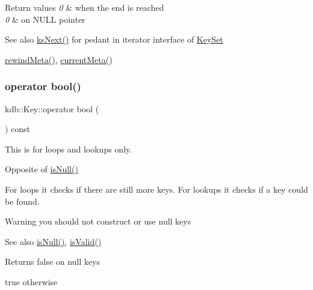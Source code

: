 \begin{DoxyRetVals}{Return values}
{\em 0} & when the end is reached \\
\hline
{\em 0} & on N\+U\+LL pointer\\
\hline
\end{DoxyRetVals}
\begin{DoxySeeAlso}{See also}
\mbox{\hyperlink{group__keyset_ga317321c9065b5a4b3e33fe1c399bcec9}{ks\+Next()}} for pedant in iterator interface of \mbox{\hyperlink{classkdb_1_1KeySet}{Key\+Set}}

\mbox{\hyperlink{classkdb_1_1Key_a002af206119ceed17b106e2449cedc91}{rewind\+Meta()}}, \mbox{\hyperlink{classkdb_1_1Key_a848292bf5591e5e845f74a487697cb19}{current\+Meta()}} 
\end{DoxySeeAlso}
\mbox{\label{classkdb_1_1Key_a15ee99e8447ee526d600e15938e4a1c0}} 
\subsubsection{\texorpdfstring{operator bool()}{operator bool()}}
{\footnotesize\ttfamily kdb\+::\+Key\+::operator bool (\begin{DoxyParamCaption}{ }\end{DoxyParamCaption}) const\hspace{0.3cm}{\ttfamily [inline]}}



This is for loops and lookups only. 

Opposite of \mbox{\hyperlink{classkdb_1_1Key_ab70b89caae5fe1e9a2e774733576fa4c}{is\+Null()}}

For loops it checks if there are still more keys. For lookups it checks if a key could be found.

\begin{DoxyWarning}{Warning}
you should not construct or use null keys
\end{DoxyWarning}
\begin{DoxySeeAlso}{See also}
\mbox{\hyperlink{classkdb_1_1Key_ab70b89caae5fe1e9a2e774733576fa4c}{is\+Null()}}, \mbox{\hyperlink{classkdb_1_1Key_a69e621790e5717c56f7275e0b8d5e27c}{is\+Valid()}} 
\end{DoxySeeAlso}
\begin{DoxyReturn}{Returns}
false on null keys 

true otherwise 
\end{DoxyReturn}
\mbox{\label{classkdb_1_1Key_a7cf40dd6e79e63765c9535a8fcee6491}} 
